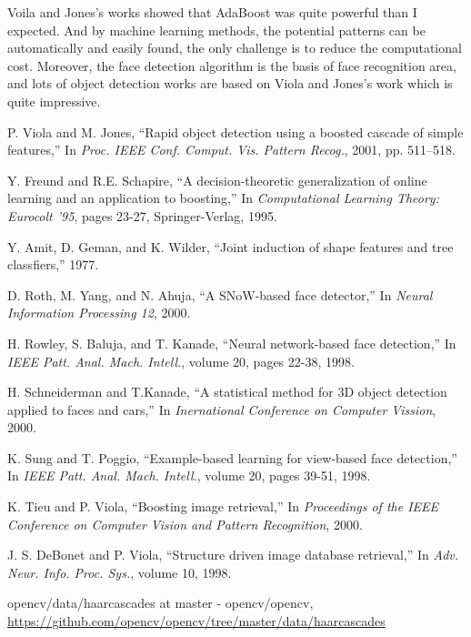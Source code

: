 \documentclass[10pt,twocolumn,letterpaper]{article}
\begin{document}
Voila and Jones's works showed that AdaBoost was quite powerful than I expected.
And by machine learning methods, the potential patterns can be automatically and easily found,
the only challenge is to reduce the computational cost.
Moreover, the face detection algorithm is the basis of face recognition area,
and lots of object detection works are based on Viola and Jones's work which is quite impressive.


\begin{thebibliography}{99}
P. Viola and M. Jones, ``Rapid object detection using a boosted cascade of simple features,''
In \textit{Proc. IEEE Conf. Comput. Vis. Pattern Recog.}, 2001, pp. 511–518.

Y. Freund and R.E. Schapire, ``A decision-theoretic generalization of online learning and an application to boosting,''
In \textit{Computational Learning Theory: Eurocolt '95}, pages 23-27, Springer-Verlag, 1995.

Y. Amit, D. Geman, and K. Wilder, ``Joint induction of shape features and tree classfiers,'' 1977.

D. Roth, M. Yang, and N. Ahuja, ``A SNoW-based face detector,''
In \textit{Neural Information Processing 12}, 2000.

H. Rowley, S. Baluja, and T. Kanade, ``Neural network-based face detection,''
In \textit{IEEE Patt. Anal. Mach. Intell.}, volume 20, pages 22-38, 1998.

H. Schneiderman and T.Kanade, ``A statistical method for 3D object detection applied to faces and cars,''
In \textit{Inernational Conference on Computer Vission}, 2000.

K. Sung and T. Poggio, ``Example-based learning for view-based face detection,''
In \textit{IEEE Patt. Anal. Mach. Intell.}, volume 20, pages 39-51, 1998.

K. Tieu and P. Viola, ``Boosting image retrieval,''
In \textit{Proceedings of the IEEE Conference on Computer Vision and Pattern Recognition}, 2000.

J. S. DeBonet and P. Viola, ``Structure driven image database retrieval,''
In \textit{Adv. Neur. Info. Proc. Sys.}, volume 10, 1998.

opencv/data/haarcascades at master - opencv/opencv,
\url{https://github.com/opencv/opencv/tree/master/data/haarcascades}


\end{thebibliography}
\end{document}
